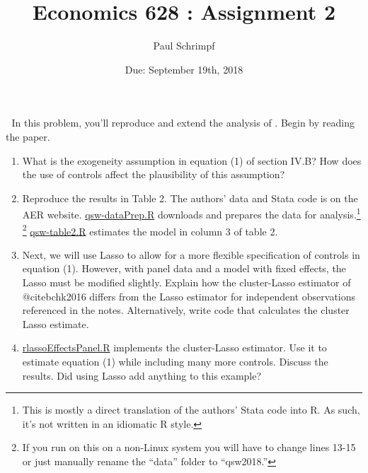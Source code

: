 

\title{Economics 628 : Assignment 2}
\author{Paul Schrimpf}
\date{Due: September 19th, 2018}


\maketitle


\begin{problem}$\;$
  In this problem, you'll reproduce and extend the analysis of
  \cite{qsw2018}. Begin by reading the paper.
  \begin{enumerate}
  \item What is the exogeneity assumption in equation (1) of section
    IV.B? How does the use of controls affect the plausibility of this
    assumption?
  \item Reproduce the results in Table 2. The authors' data and Stata
    code is on the AER website.
    \href{https://github.com/ubcecon/ECON628_2018/tree/master/paul/assignments/02/qsw-dataPrep.R}
    {qsw-dataPrep.R} 
    downloads and prepares the data for analysis.\footnote{This is
      mostly a direct translation of the authors' Stata code into
      R. As such, it's not written in an idiomatic R style.}
    \footnote{If you
      run on this on a non-Linux system you will have to change lines
      13-15 or just manually rename the ``data'' folder to ``qsw2018.''}
    \href{https://github.com/ubcecon/ECON628_2018/tree/master/paul/assignments/02/qsw-table2.R}
    {qsw-table2.R} estimates the model in column 3 of table 2.
  \item Next, we will use Lasso to allow for a more flexible
    specification of controls in equation (1). However, with panel
    data and a model with fixed effects, the Lasso must be modified
    slightly. Explain how the cluster-Lasso estimator of
    @cite{bchk2016} differs from the Lasso estimator for independent
    observations referenced in the notes. Alternatively, write code
    that calculates the cluster Lasso estimate. 
  \item
    \href{https://github.com/ubcecon/ECON628_2018/tree/master/paul/assignments/02/rlassoEffectsPanel.R}
    {rlassoEffectsPanel.R}
    implements the cluster-Lasso estimator. Use it to estimate equation (1) while including many
    more controls. Discuss the results. Did using Lasso add anything
    to this example?
  \end{enumerate}
\end{problem}







